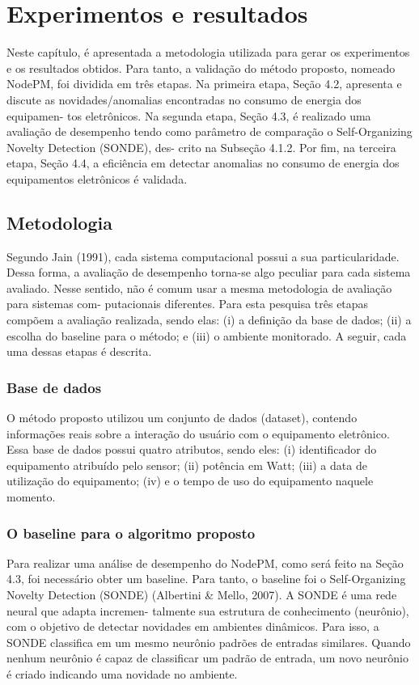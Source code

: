 \chapter{Experimentos e resultados}
Neste capítulo, é apresentada a metodologia utilizada para gerar os experimentos e os resultados obtidos. Para tanto, a validação do método proposto, nomeado NodePM, foi dividida em três etapas. Na primeira etapa, Seção 4.2, apresenta e discute as novidades/anomalias encontradas no consumo de energia dos equipamen- tos eletrônicos. Na segunda etapa, Seção 4.3, é realizado uma avaliação de desempenho tendo como parâmetro de comparação o Self-Organizing Novelty Detection (SONDE), des- crito na Subseção 4.1.2. Por fim, na terceira etapa, Seção 4.4, a eficiência em detectar anomalias no consumo de energia dos equipamentos eletrônicos é validada.


\section{Metodologia}

Segundo Jain (1991), cada sistema computacional possui a sua particularidade. Dessa forma, a avaliação de desempenho torna-se algo peculiar para cada sistema avaliado. Nesse sentido, não é comum usar a mesma metodologia de avaliação para sistemas com- putacionais diferentes. Para esta pesquisa três etapas compõem a avaliação realizada, sendo elas: (i) a definição da base de dados; (ii) a escolha do baseline para o método; e (iii) o ambiente monitorado. A seguir, cada uma dessas etapas é descrita.


\subsection{Base de dados}


O método proposto utilizou um conjunto de dados (dataset), contendo informações reais sobre a interação do usuário com o equipamento eletrônico. Essa base de dados possui quatro atributos, sendo eles: (i) identificador do equipamento atribuído pelo sensor; (ii) potência em Watt; (iii) a data de utilização do equipamento; (iv) e o tempo de uso do equipamento naquele momento.


\subsection{O baseline para o algoritmo proposto}
Para realizar uma análise de desempenho do NodePM, como será feito na Seção 4.3, foi necessário obter um baseline. Para tanto, o baseline foi o Self-Organizing Novelty Detection (SONDE) (Albertini & Mello, 2007). A SONDE é uma rede neural que adapta incremen- talmente sua estrutura de conhecimento (neurônio), com o objetivo de detectar novidades em ambientes dinâmicos. Para isso, a SONDE classifica em um mesmo neurônio padrões de entradas similares. Quando nenhum neurônio é capaz de classificar um padrão de entrada, um novo neurônio é criado indicando uma novidade no ambiente.


